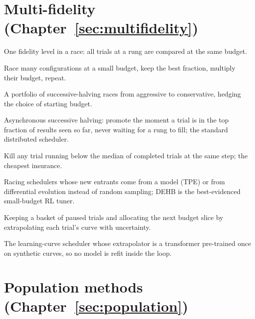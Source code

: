 \section*{Multi-fidelity (Chapter~\ref{sec:multifidelity})}

\begin{description}[leftmargin=1.5em, itemsep=1pt, font=\normalfont\bfseries]
\item[rung] One fidelity level in a race: all trials at a rung are
compared at the same budget.
\item[successive halving] Race many configurations at a small budget,
keep the best fraction, multiply their budget, repeat.
\item[Hyperband] A portfolio of successive-halving races from
aggressive to conservative, hedging the choice of starting budget.
\item[ASHA] Asynchronous successive halving: promote the moment a trial
is in the top fraction of results seen so far, never waiting for a rung
to fill; the standard distributed scheduler.
\item[median stopping rule] Kill any trial running below the median of
completed trials at the same step; the cheapest insurance.
\item[BOHB / DEHB] Racing schedulers whose new entrants come from a
model (TPE) or from differential evolution instead of random sampling;
DEHB is the best-evidenced small-budget RL tuner.
\item[freeze-thaw / learning-curve scheduling] Keeping a basket of
paused trials and allocating the next budget slice by extrapolating
each trial's curve with uncertainty.
\item[ifBO] The learning-curve scheduler whose extrapolator is a
transformer pre-trained once on synthetic curves, so no model is refit
inside the loop.
\end{description}

\section*{Population methods (Chapter~\ref{sec:population})}

